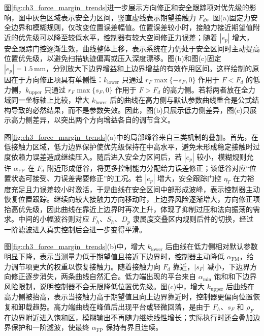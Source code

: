 图\ref{fig:ch3_force_margin_trends}进一步展示方向修正和安全跟踪项对优先级的影响，图中灰色区域表示安全力区间，竖直虚线表示期望接触力 $F_d$。图(a)固定力安全边界和模糊规则，仅改变位置误差幅值。位置误差较小时，接触力接近期望值附近的优先级可以降至较低水平，控制器有较大空间修正力误差；随着 $|e_p|$ 增大，安全跟踪门控逐渐生效，曲线整体上移，表示系统在力仍处于安全区间时主动提高位置优先级，以避免扫描轨迹偏离或压入深度漂移。图(b)和图(c)固定 $|e_p|=1.5\,\mathrm{mm}$，分别放大下边界增益和上边界增益的有效作用区间。这样绘制的原因在于方向修正项具有单侧性：$k_{\mathrm{lower}}$ 只通过 $r_F\max\{-s_F,0\}$ 作用于 $F<F_d$ 的低力侧，$k_{\mathrm{upper}}$ 只通过 $r_F\max\{s_F,0\}$ 作用于 $F>F_d$ 的高力侧。若将两者放在全力域同一坐标轴上比较，增大 $k_{\mathrm{lower}}$ 后的曲线在高力侧与默认参数曲线重合是公式结构导致的必然结果，而不是参数失效。因此，图(b)只展示低力侧差异，图(c)只展示高力侧差异，以突出两个方向增益各自的调节含义。

图\ref{fig:ch3_force_margin_trends}(a)中的局部峰谷来自三类机制的叠加。首先，在低接触力区域，低力边界保护使优先级保持在中高水平，避免未形成稳定接触时过度依赖力误差造成继续压入。随后进入安全力区间后，若 $|e_p|$ 较小，模糊规则允许 $\alpha_{\mathrm{FP}}$ 在 $F_d$ 附近形成低谷，将更多控制能力分配给力误差修正；该低谷对应“位置状态可接受、力误差需要修正”的工况。若 $|e_p|$ 增大，安全跟踪门控 $\eta_T$ 在力裕度充足且力误差较小时激活，于是曲线在安全区间中部形成波峰，表示控制器主动恢复位置跟踪。继续向较大接触力方向移动时，上边界风险逐渐增大，方向修正项抬高优先级，因此曲线在靠近上边界时再次上升，体现了抑制过压和法向振荡的需求。中间的小幅波谷则对应 $F_h$、$S_h$、$D_p$ 隶属度交叠区内规则后件的切换，经过一阶滤波进入真实控制后会进一步变得平滑。

图\ref{fig:ch3_force_margin_trends}(b)中，增大 $k_{\mathrm{lower}}$ 后曲线在低力侧相对默认参数明显下降，表示当测量力低于期望值且接近下边界时，控制器主动降低 $\alpha_{\mathrm{FM}}$，给力调节项更大的权重以恢复接触力。随着接触力向 $F_d$ 靠近，$|s_F|$ 减小，下边界方向修正逐步消失，两条曲线自然汇合。低力端出现的平台来自 $\alpha_{\min}$ 饱和和下边界风险限制，说明控制器不会无限降低位置优先级。图(c)中，增大 $k_{\mathrm{upper}}$ 后曲线在高力侧被抬高，表示当接触力高于期望值且向上边界靠近时，控制器更偏向位置恢复和卸载趋势。高力端曲线在峰值后出现平台或轻微回落，是由于 $F_h$、$s_F$ 和 $\rho_F$ 在边界附近进入饱和区，模糊输出不再随力继续线性增长；实际执行时还会叠加边界保护和一阶滤波，使最终 $\alpha_{\mathrm{FP}}$ 保持有界且连续。

